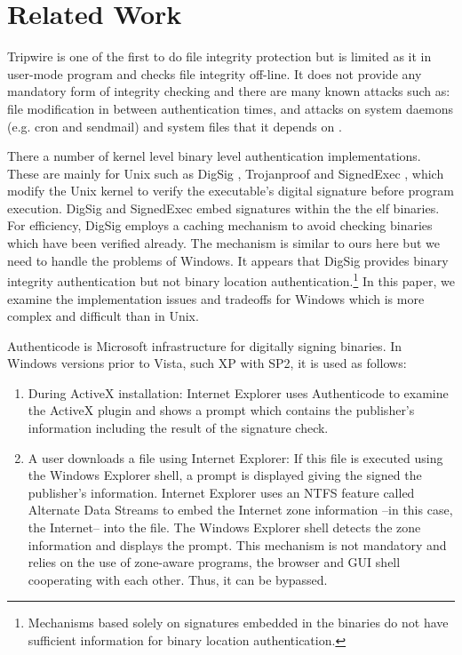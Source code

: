 \section{Related Work}
\label{sect:related}

Tripwire \cite{KS93} is one of the first to do file integrity protection
but is limited as it in user-mode program and 
checks file integrity off-line.
It does not provide any mandatory form of integrity checking and
there are many known attacks such as:
file modification in between authentication times,
and attacks on system daemons (e.g. cron and sendmail)
and system files that it depends on \cite{Arnold,SKO05}.

There a number of kernel level binary level authentication implementations.
These are mainly for Unix
such as DigSig \cite{digsig}, Trojanproof \cite{williams}
and SignedExec \cite{signedexec}, which modify the Unix kernel
to verify the executable's digital signature before program execution.
DigSig and SignedExec embed signatures within the the elf binaries.
For efficiency, DigSig employs a caching mechanism to avoid checking
binaries which have been verified already. The mechanism is similar 
to ours here but we need to handle the problems of Windows.
It appears that DigSig provides binary integrity authentication
but not binary location authentication.\footnote{Mechanisms based solely on
signatures embedded in the binaries do not have sufficient information
for binary location authentication.}
In this paper, we examine the implementation issues and tradeoffs
for Windows which is more complex and difficult than in Unix.

Authenticode \cite{authenticode} is Microsoft infrastructure
for digitally signing binaries.
In Windows versions prior to Vista, such XP with SP2,
it is used as follows:
\begin{enumerate}
\item During ActiveX installation:
Internet Explorer uses Authenticode to examine the ActiveX plugin 
and shows a prompt which contains the publisher's information
including the result of the signature check.
\item A user downloads a file using Internet Explorer:
If this file is executed using the Windows Explorer shell,
a prompt is displayed giving the signed the publisher's information.
Internet Explorer uses an NTFS feature called
Alternate Data Streams to embed the Internet zone information --in this case,
the Internet-- into the file.
The Windows Explorer shell detects the zone information and displays the prompt.
This mechanism is not mandatory and relies on the use of zone-aware programs,
the browser and GUI shell cooperating with each other.
Thus, it can be bypassed.
\end{enumerate}


